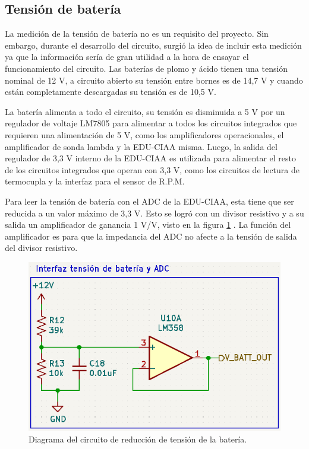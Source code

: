 \subsection{Tensión de batería}

La medición de la tensión de batería no es un requisito del proyecto. Sin embargo, durante el desarrollo del circuito, surgió la idea de incluir esta medición ya que la información sería de gran utilidad a la hora de ensayar el funcionamiento del circuito.
Las baterías de plomo y ácido tienen una tensión nominal de 12 V, a circuito abierto su tensión entre bornes es de 14,7 V y cuando están completamente descargadas su tensión es de 10,5 V.

La batería alimenta a todo el circuito, su tensión es disminuida a 5 V por un regulador de voltaje LM7805 para alimentar a todos los circuitos integrados que requieren una alimentación de 5 V, como los amplificadores operacionales, el amplificador de sonda lambda y la EDU-CIAA misma. Luego, la salida del regulador de 3,3 V interno de la EDU-CIAA es utilizada para alimentar el resto de los circuitos integrados que operan con 3,3 V, como los circuitos de lectura de termocupla y la interfaz para el sensor de R.P.M.

Para leer la tensión de batería con el ADC de la EDU-CIAA, esta tiene que ser reducida a un valor máximo de 3,3 V. Esto se logró con un divisor resistivo y a su salida un amplificador de ganancia 1 V/V, visto en la figura \ref{fig:circuito-bat} . La función del amplificador es para que la impedancia del ADC no afecte a la tensión de salida del divisor resistivo.

\begin{figure}[htpb]
\centering
\includegraphics[width=.7\textwidth]{./Figures/ampli-bat.png}
\caption{Diagrama del circuito de reducción de tensión de la batería.}
\label{fig:circuito-bat}
\end{figure}

